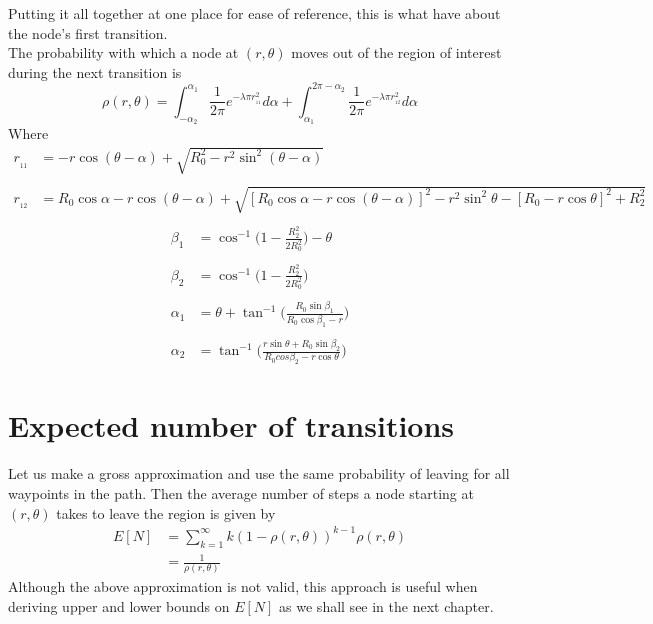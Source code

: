 \newpage
Putting it all together at one place for ease of reference, this is what have about the node's
first transition. \\
The probability with which a 
node at $(r,\theta)$ moves out of the region of interest during the next transition is 
\begin{equation} \label{eq:oneOutProb}
	\rho(r,\theta) = \int_{-\alpha_2}^{\alpha_1} \frac{1}{2\pi} e^{-\lambda \pi r_{\!_{11}}^2} d\alpha +  \int^{2\pi-\alpha_2}_{\alpha_1} \frac{1}{2\pi} e^{-\lambda \pi r_{\!_{12}}^2} d\alpha
\end{equation}
Where
\begin{align*}
	r_{\!_{11}} &= -r\cos(\theta -\alpha) + \sqrt{R_0^2 - r^2\sin^2(\theta - \alpha)} \\
	&\\
	r_{\!_{12}} &= R_0 \cos \alpha - r\cos(\theta - \alpha)  +  \sqrt{[R_0 \cos \alpha - r\cos(\theta-\alpha) ]^2 - r^2\sin^2 \theta - [R_0 - r\cos \theta]^2 + R_2^2} \\
\end{align*}
\begin{align*}
	\beta_1 &= \cos^{-1}\bigg(1-\frac{R_2^2}{2R_0^2}\bigg) - \theta \\
	& \\
		\beta_2 &= \cos^{-1}\bigg(1-\frac{R_2^2}{2R_0^2}\bigg) \\
	& \\
	\alpha_1 &= \theta + \tan^{-1}\bigg( \frac{R_0\sin\beta_1}{R_0\cos\beta_1-r}\bigg)\\
			& \\
			\alpha_2 &= \tan^{-1}\bigg( \frac{r\sin\theta + R_0\sin\beta_2}{R_0cos\beta_2 - r\cos\theta} \bigg)
\end{align*}

\section{Expected number of transitions}
Let us make a gross approximation and use the same probability of leaving for all waypoints
in the path. Then the average number of steps a node starting at $(r,\theta)$ takes to leave the region is given by
\begin{align*}
	E[N] &= \sum_{k=1}^{\infty} k(1-\rho(r,\theta))^{k-1} \rho(r,\theta) \\[2ex]
	&= \frac{1}{\rho(r,\theta)}
\end{align*}
Although the above approximation is not valid, this approach is useful when deriving upper and lower bounds on $E[N]$ as we shall see in the next chapter.
